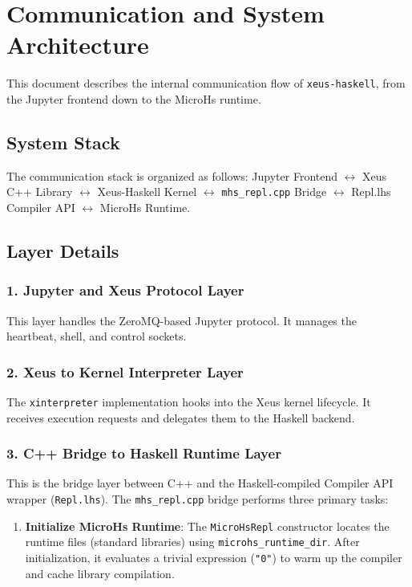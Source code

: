 \section{Communication and System Architecture}


This document describes the internal communication flow of \texttt{xeus-haskell}, from the Jupyter frontend down to the MicroHs runtime.
\subsection{System Stack}


The communication stack is organized as follows:
Jupyter Frontend \(\leftrightarrow\) Xeus C++ Library \(\leftrightarrow\) Xeus-Haskell Kernel \(\leftrightarrow\) \texttt{mhs\_repl.cpp} Bridge \(\leftrightarrow\) Repl.lhs Compiler API \(\leftrightarrow\) MicroHs Runtime.


\subsection{Layer Details}


\subsubsection{1. Jupyter and Xeus Protocol Layer}


This layer handles the ZeroMQ-based Jupyter protocol. It manages the heartbeat, shell, and control sockets.
\subsubsection{2. Xeus to Kernel Interpreter Layer}


The \texttt{xinterpreter} implementation hooks into the Xeus kernel lifecycle. It receives execution requests and delegates them to the Haskell backend.
\subsubsection{3. C++ Bridge to Haskell Runtime Layer}


This is the bridge layer between C++ and the Haskell-compiled Compiler API wrapper (\texttt{Repl.lhs}).
The \texttt{mhs\_repl.cpp} bridge performs three primary tasks:
\begin{enumerate}
\item \textbf{Initialize MicroHs Runtime}:
   The \texttt{MicroHsRepl} constructor locates the runtime files (standard libraries) using \texttt{microhs\_runtime\_dir}. After initialization, it evaluates a trivial expression (\texttt{"0"}) to warm up the compiler and cache library compilation.\end{enumerate}


